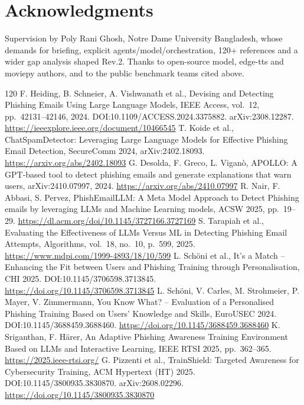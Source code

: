 \documentclass[11pt,a4paper]{article}
\begin{document}
\section*{Acknowledgments}
Supervision by Poly Rani Ghosh, Notre Dame University Bangladesh, whose demands for briefing, explicit agents/model/orchestration, 120+ references and a wider gap analysis shaped Rev.2. Thanks to open-source model, edge-tts and moviepy authors, and to the public benchmark teams cited above.

\begin{thebibliography}{120}
 F. Heiding, B. Schneier, A. Vishwanath et al., Devising and Detecting Phishing Emails Using Large Language Models, IEEE Access, vol.~12, pp.~42131--42146, 2024. DOI:10.1109/ACCESS.2024.3375882. arXiv:2308.12287. \url{https://ieeexplore.ieee.org/document/10466545}
 T. Koide et al., ChatSpamDetector: Leveraging Large Language Models for Effective Phishing Email Detection, SecureComm 2024, arXiv:2402.18093. \url{https://arxiv.org/abs/2402.18093}
 G. Desolda, F. Greco, L. Vigan\`o, APOLLO: A GPT-based tool to detect phishing emails and generate explanations that warn users, arXiv:2410.07997, 2024. \url{https://arxiv.org/abs/2410.07997}
 R. Nair, F. Abbasi, S. Pervez, PhishEmailLLM: A Meta Model Approach to Detect Phishing emails by leveraging LLMs and Machine Learning models, ACSW 2025, pp.~19--29. \url{https://dl.acm.org/doi/10.1145/3727166.3727169}
 S. Tarapiah et al., Evaluating the Effectiveness of LLMs Versus ML in Detecting Phishing Email Attempts, Algorithms, vol.~18, no.~10, p.~599, 2025. \url{https://www.mdpi.com/1999-4893/18/10/599}
 L. Sch\"oni et al., It's a Match -- Enhancing the Fit between Users and Phishing Training through Personalisation, CHI 2025. DOI:10.1145/3706598.3713845. \url{https://doi.org/10.1145/3706598.3713845}
 L. Sch\"oni, V. Carles, M. Strohmeier, P. Mayer, V. Zimmermann, You Know What? -- Evaluation of a Personalised Phishing Training Based on Users' Knowledge and Skills, EuroUSEC 2024. DOI:10.1145/3688459.3688460. \url{https://doi.org/10.1145/3688459.3688460}
 K. Sriganthan, F. H\"arer, An Adaptive Phishing Awareness Training Environment Based on LLMs and Interactive Learning, IEEE RTSI 2025, pp.~362--365. \url{https://2025.ieee-rtsi.org/}
 G. Pizzenti et al., TrainShield: Targeted Awareness for Cybersecurity Training, ACM Hypertext (HT) 2025. DOI:10.1145/3800935.3830870. arXiv:2608.02296. \url{https://doi.org/10.1145/3800935.3830870}

\end{thebibliography}
\end{document}
